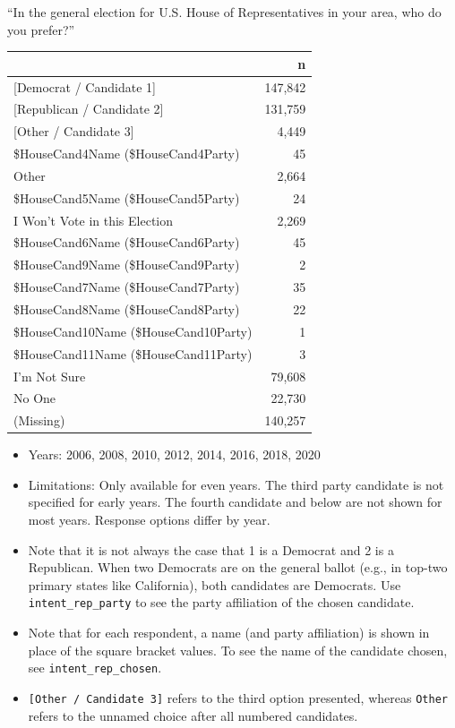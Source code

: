 \documentclass[10pt,article,oneside]{memoir}
\theoremstyle{definition}
\begin{document}
``In the general election for U.S. House of Representatives in your
area, who do you prefer?''

\begin{table}[H]
\centering
\begin{tabular}[t]{lr}
\toprule
 & n\\
\midrule
{}{[Democrat / Candidate 1]} & 147,842\\
{}{[Republican / Candidate 2]} & 131,759\\
{}{[Other / Candidate 3]} & 4,449\\
\$HouseCand4Name (\$HouseCand4Party) & 45\\
Other & 2,664\\
\$HouseCand5Name (\$HouseCand5Party) & 24\\
I Won't Vote in this Election & 2,269\\
\$HouseCand6Name (\$HouseCand6Party) & 45\\
\$HouseCand9Name (\$HouseCand9Party) & 2\\
\$HouseCand7Name (\$HouseCand7Party) & 35\\
\$HouseCand8Name (\$HouseCand8Party) & 22\\
\$HouseCand10Name (\$HouseCand10Party) & 1\\
\$HouseCand11Name (\$HouseCand11Party) & 3\\
I'm Not Sure & 79,608\\
No One & 22,730\\
(Missing) & 140,257\\
\bottomrule
\end{tabular}
\end{table}

\begin{itemize}
\tightlist
\item
  Years: 2006, 2008, 2010, 2012, 2014, 2016, 2018, 2020
\item
  Limitations: Only available for even years. The third party candidate
  is not specified for early years. The fourth candidate and below are
  not shown for most years. Response options differ by year.
\item
  Note that it is not always the case that 1 is a Democrat and 2 is a
  Republican. When two Democrats are on the general ballot (e.g., in
  top-two primary states like California), both candidates are
  Democrats. Use \texttt{intent\_rep\_party} to see the party
  affiliation of the chosen candidate.
\item
  Note that for each respondent, a name (and party affiliation) is shown
  in place of the square bracket values. To see the name of the
  candidate chosen, see \texttt{intent\_rep\_chosen}.
\item
  \texttt{{[}Other\ /\ Candidate\ 3{]}} refers to the third option
  presented, whereas \texttt{Other} refers to the unnamed choice after
  all numbered candidates.
\end{itemize}
\end{document}

